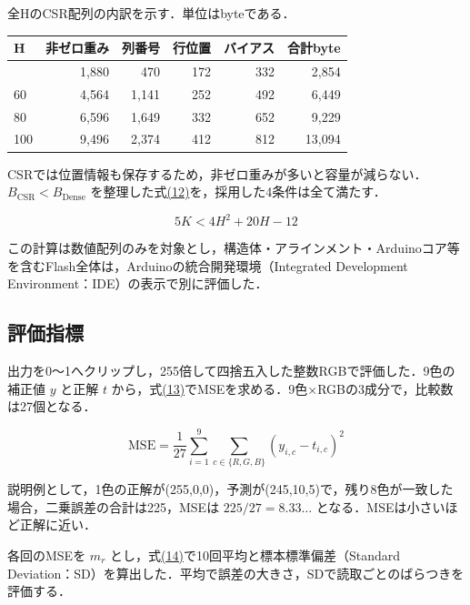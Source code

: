 \documentclass[
  10pt,
  a4paper,
]{article}
\begin{document}

全HのCSR配列の内訳を示す．単位はbyteである．

\begin{longtable}[]{@{}lrrrrr@{}}
\toprule\noalign{}
H & 非ゼロ重み & 列番号 & 行位置 & バイアス & 合計byte \\
\midrule\noalign{}
\endhead
\bottomrule\noalign{}
\endlastfoot
40 & 1,880 & 470 & 172 & 332 & 2,854 \\
60 & 4,564 & 1,141 & 252 & 492 & 6,449 \\
80 & 6,596 & 1,649 & 332 & 652 & 9,229 \\
100 & 9,496 & 2,374 & 412 & 812 & 13,094 \\
\end{longtable}

CSRでは位置情報も保存するため，非ゼロ重みが多いと容量が減らない．\(B_{\mathrm{CSR}}<B_{\mathrm{Dense}}\)
を整理した式\hyperref[eq:capacity-condition]{(12)}を，採用した4条件は全て満たす．

\begin{equation}\label{eq:capacity-condition}
5K<4H^2+20H-12
\end{equation}

この計算は数値配列のみを対象とし，構造体・アラインメント・Arduinoコア等を含むFlash全体は，Arduinoの統合開発環境（Integrated
Development Environment：IDE）の表示で別に評価した．

\subsection{評価指標}\label{ux8a55ux4fa1ux6307ux6a19}

出力を0〜1へクリップし，255倍して四捨五入した整数RGBで評価した．9色の補正値
\(y\) と正解 \(t\)
から，式\hyperref[eq:mse]{(13)}でMSEを求める．9色×RGBの3成分で，比較数は27個となる．

\begin{equation}\label{eq:mse}
\mathrm{MSE}=\frac{1}{27}\sum_{i=1}^{9}\sum_{c\in\{R,G,B\}}(y_{i,c}-t_{i,c})^2
\end{equation}

説明例として，1色の正解が(255,0,0)，予測が(245,10,5)で，残り8色が一致した場合，二乗誤差の合計は225，MSEは
\(225/27=8.33\ldots\) となる．MSEは小さいほど正解に近い．

各回のMSEを \(m_r\)
とし，式\hyperref[eq:statistics]{(14)}で10回平均と標本標準偏差（Standard
Deviation：SD）を算出した．平均で誤差の大きさ，SDで読取ごとのばらつきを評価する．
\end{document}
